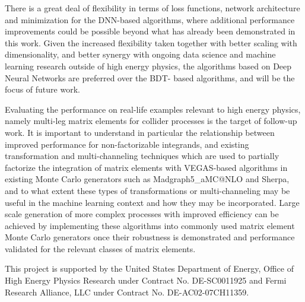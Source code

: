 \documentclass[a4paper,11pt]{article}
\begin{document}
There is a great deal of flexibility in terms of loss functions, network architecture and minimization for the DNN-based algorithms, where additional performance improvements could be possible beyond what has already been demonstrated in this work.  Given the increased flexibility taken together with better scaling with dimensionality, and better synergy with ongoing data science and machine learning research outside of high energy physics, the algorithms based on Deep Neural Networks are preferred over the BDT-
based algorithms, and will be the focus of future work.

Evaluating the performance on real-life examples relevant to high energy physics, namely multi-leg matrix elements for collider processes is the target of follow-up work.  It is important to understand in particular the relationship between improved performance for non-factorizable integrands, and existing transformation and multi-channeling techniques which are used to partially factorize the integration of matrix elements with VEGAS-based algorithms in existing Monte Carlo generators such as Madgraph5\_aMC@NLO\cite{mg5amc} and Sherpa\cite{sherpa}, and to what extent these types of transformations or multi-channeling may be useful in the machine learning context and how they may be incorporated.  Large scale generation of more complex processes with improved efficiency can be achieved by implementing these algorithms into commonly used matrix element Monte Carlo generators once their robustness is demonstrated and performance validated for the relevant classes of matrix elements.

\acknowledgments
This project is supported by the United States Department of Energy, Office of High Energy Physics Research
under Contract No. DE-SC0011925 and Fermi Research Alliance, LLC under Contract No. DE-AC02-07CH11359.


% 


\end{document}
